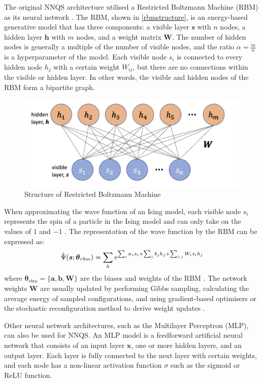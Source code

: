 The original NNQS architecture utilised a Restricted Boltzmann Machine (RBM) as its neural network \cite{b20}. The RBM, shown in \autoref{rbmstructure}, is an energy-based generative model that has three components: a visible layer $\boldsymbol{s}$ with $n$ nodes, a hidden layer $\boldsymbol{h}$ with $m$ nodes, and a weight matrix $\mathbf{W}$. The number of hidden nodes is generally a multiple of the number of visible nodes, and the ratio $\alpha = \frac{m}{n}$ is a hyperparameter of the model. Each visible node $s_i$ is connected to every hidden node $h_j$ with a certain weight $W_{ij}$, but there are no connections within the visible or hidden layer. In other words, the visible and hidden nodes of the RBM form a bipartite graph.
\begin{figure}[htb!]
    \centering
    \includegraphics[width=0.9\linewidth]{images/rbm_diagram.png}
    \caption{Structure of Restricted Boltzmann Machine}
    \label{rbmstructure}
\end{figure}

When approximating the wave function of an Ising model, each visible node $s_i$ represents the spin of a particle in the Ising model and can only take on the values of $1$ and $-1$ \cite{b20}. The representation of the wave function by the RBM can be expressed as:
\begin{equation}
    \Hat{\Psi}(\boldsymbol{s} ; \boldsymbol{\theta}_{rbm}) = \sum_{h} e^{\sum_i a_s s_i + \sum_j b_j h_j + \sum_{i,j}W_i s_i h_j} 
\end{equation}
where  $\boldsymbol{\theta}_{rbm} = \{\boldsymbol{a}, \boldsymbol{b}, \boldsymbol{W}\}$ are the biases and weights of the RBM \cite{b20}. The network weights $\mathbf{W}$ are usually updated by performing Gibbs sampling, calculating the average energy of sampled configurations, and using gradient-based optimisers or the stochastic reconfiguration method to derive weight updates \cite{b25}.

Other neural network architectures, such as the Multilayer Perceptron (MLP), can also be used for NNQS. An MLP model is a feedforward artificial neural network that consists of an input layer $\boldsymbol{x}$, one or more hidden layers, and an output layer. Each layer is fully connected to the next layer with certain weights, and each node has a non-linear activation function $\sigma$ such as the sigmoid or ReLU function. 

